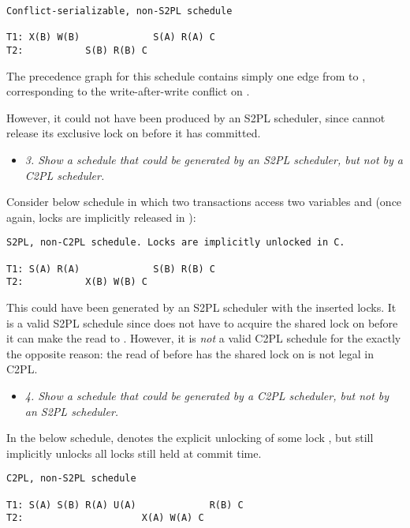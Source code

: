 \begin{verbatim}
Conflict-serializable, non-S2PL schedule

T1: X(B) W(B)             S(A) R(A) C
T2:           S(B) R(B) C
\end{verbatim}

The precedence graph for this schedule contains simply one edge from  to
, corresponding to the write-after-write conflict on .\medskip

However, it could not have been produced by an S2PL scheduler, since 
cannot release its exclusive lock on  before it has committed.

\streg

\begin{itemize}
  \item \textit{3. Show a schedule that could be generated by an S2PL scheduler,
    but not by a C2PL scheduler.}
\end{itemize}


Consider below schedule in which two transactions access two variables 
and  (once again, locks are implicitly released in ):

\begin{verbatim}
S2PL, non-C2PL schedule. Locks are implicitly unlocked in C.

T1: S(A) R(A)             S(B) R(B) C
T2:           X(B) W(B) C
\end{verbatim}


This could have been generated by an S2PL scheduler with the inserted locks. It
is a valid S2PL schedule since  does not have to acquire the shared lock
on  before it can make the read to . However, it is \textit{not}
a valid C2PL schedule for the exactly the opposite reason: the read of 
before  has the shared lock on  is not legal in C2PL.

\streg

\begin{itemize}
  \item \textit{4. Show a schedule that could be generated by a C2PL scheduler,
    but not by an S2PL scheduler.}
\end{itemize}

In the below schedule,  denotes the explicit unlocking of some lock
, but  still implicitly unlocks all locks still held at commit time.

\begin{verbatim}
C2PL, non-S2PL schedule

T1: S(A) S(B) R(A) U(A)             R(B) C
T2:                     X(A) W(A) C
\end{verbatim}


